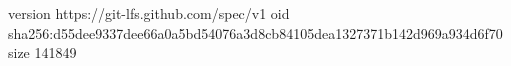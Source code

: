 version https://git-lfs.github.com/spec/v1
oid sha256:d55dee9337dee66a0a5bd54076a3d8cb84105dea1327371b142d969a934d6f70
size 141849
